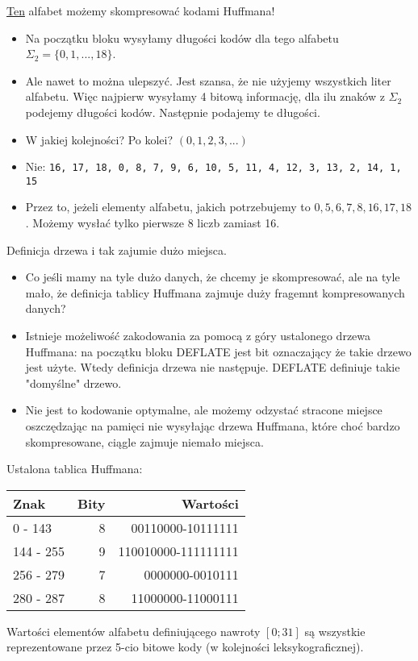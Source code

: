 \documentclass[presentation]{beamer}
\begin{document}
\begin{frame}[label={sec:org20f081b}]{\uline{Ten} alfabet możemy skompresować kodami Huffmana!}
\begin{itemize}
\item Na początku bloku wysyłamy długości kodów dla tego alfabetu \(\Sigma_{2} =
     \{0, 1, ..., 18\}\).
\item Ale nawet to można ulepszyć. Jest szansa, że nie użyjemy wszystkich liter
alfabetu. Więc najpierw wysyłamy 4 bitową informację, dla ilu znaków z
\(\Sigma_{\text{2}}\) podejemy długości kodów. Następnie podajemy te długości.
\item W jakiej kolejności? Po kolei? \((0, 1, 2, 3, ...)\)
\item Nie: \texttt{16, 17, 18, 0, 8, 7, 9, 6, 10, 5, 11, 4, 12, 3, 13, 2, 14, 1, 15}
\item Przez to, jeżeli elementy alfabetu, jakich potrzebujemy to \(0, 5, 6, 7, 8,
     16, 17, 18\). Możemy wysłać tylko pierwsze 8 liczb zamiast 16.
\end{itemize}
\end{frame}

\begin{frame}[label={sec:orgc9d305b}]{Definicja drzewa i tak zajumie dużo miejsca.}
\begin{itemize}
\item Co jeśli mamy na tyle dużo danych, że chcemy je skompresować, ale na tyle
mało, że definicja tablicy Huffmana zajmuje duży fragemnt kompresowanych
danych?
\item Istnieje możeliwość zakodowania za pomocą z góry ustalonego drzewa
Huffmana: na początku bloku DEFLATE jest bit oznaczający że takie drzewo
jest użyte. Wtedy definicja drzewa nie następuje. DEFLATE definiuje takie
"domyślne" drzewo.
\item Nie jest to kodowanie optymalne, ale możemy odzystać stracone miejsce
oszczędzając na pamięci nie wysyłając drzewa Huffmana, które choć bardzo
skompresowane, ciągle zajmuje niemało miejsca.
\end{itemize}
\end{frame}

\begin{frame}[label={sec:org6d2c57e}]{Ustalona tablica Huffmana:}
\begin{center}
\begin{tabular}{lrr}
Znak & Bity & Wartości\\
\hline
0 - 143 & 8 & 00110000-10111111\\
144 - 255 & 9 & 110010000-111111111\\
256 - 279 & 7 & 0000000-0010111\\
280 - 287 & 8 & 11000000-11000111\\
\end{tabular}
\end{center}

Wartości elementów alfabetu definiującego nawroty \([0; 31]\) są wszystkie
reprezentowane przez 5-cio bitowe kody (w kolejności leksykograficznej).
\end{frame}
\end{document}
